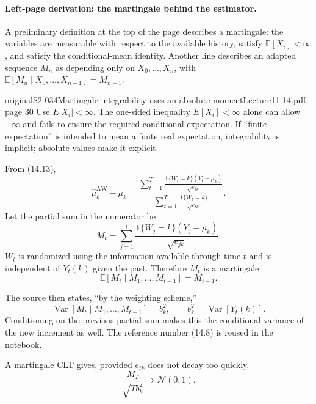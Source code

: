 \paragraph{Left-page derivation: the martingale behind the estimator.}
A preliminary definition at the top of the page describes a martingale: the variables are measurable with respect to the available history, satisfy $\mathbb E[X_i]<\infty$, and satisfy the conditional-mean identity. Another line describes an adapted sequence $M_n$ as depending only on $X_0,\ldots,X_n$, with
$\mathbb E[M_n\mid X_0,\ldots,X_{n-1}]=M_{n-1}$.

\begin{reviewnote}{original}{S2-034}{Martingale integrability uses an absolute moment}{Lecture11-14.pdf, page 30}
Use $E|X_i|<\infty$. The one-sided inequality $E[X_i]<\infty$ alone can allow $-\infty$ and fails to ensure the required conditional expectation. If ``finite expectation'' is intended to mean a finite real expectation, integrability is implicit; absolute values make it explicit.
\end{reviewnote}


From (14.13),
\[
 \widehat\mu_k^{\mathrm{AW}}-\mu_k
 =\frac{\displaystyle\sum_{t=1}^T
 \frac{\mathbf1\{W_t=k\}(Y_t-\mu_k)}{\sqrt{e_{tk}}}}
 {\displaystyle\sum_{t=1}^T
 \frac{\mathbf1\{W_t=k\}}{\sqrt{e_{tk}}}}.
\]
Let the partial sum in the numerator be
\[
 M_t=\sum_{j=1}^t
 \frac{\mathbf1\{W_j=k\}(Y_j-\mu_k)}{\sqrt{e_{jk}}}.
\]
$W_t$ is randomized using the information available through time $t$ and is independent of $Y_t(k)$ given the past. Therefore $M_t$ is a martingale:
\[
 \mathbb E[M_t\mid M_1,\ldots,M_{t-1}]=M_{t-1}.
\]

The source then states, ``by the weighting scheme,''
\[
 \operatorname{Var}[M_t\mid M_1,\ldots,M_{t-1}]=b_k^2,
 \qquad b_k^2=\operatorname{Var}[Y_t(k)].\tag{14.8, as labeled in the scan}
\]
Conditioning on the previous partial sum makes this the conditional variance of the new increment as well. The reference number (14.8) is reused in the notebook.

A martingale CLT gives, provided $e_{tk}$ does not decay too quickly,
\[
 \frac{M_T}{\sqrt{Tb_k^2}}\Rightarrow\mathcal N(0,1).
\]

